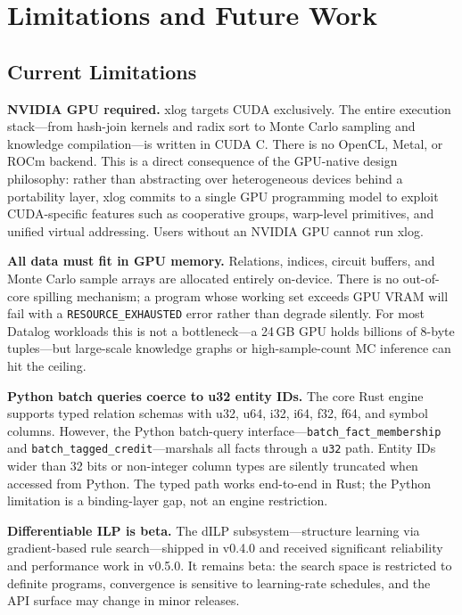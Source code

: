 \section{Limitations and Future Work}\label{sec:limits}

\subsection{Current Limitations}

\textbf{NVIDIA GPU required.} xlog targets CUDA exclusively. The entire execution stack---from hash-join kernels and radix sort to Monte Carlo sampling and knowledge compilation---is written in CUDA C. There is no OpenCL, Metal, or ROCm backend. This is a direct consequence of the GPU-native design philosophy: rather than abstracting over heterogeneous devices behind a portability layer, xlog commits to a single GPU programming model to exploit CUDA-specific features such as cooperative groups, warp-level primitives, and unified virtual addressing. Users without an NVIDIA GPU cannot run xlog.

\textbf{All data must fit in GPU memory.} Relations, indices, circuit buffers, and Monte Carlo sample arrays are allocated entirely on-device. There is no out-of-core spilling mechanism; a program whose working set exceeds GPU VRAM will fail with a \texttt{RESOURCE\_EXHAUSTED} error rather than degrade silently. For most Datalog workloads this is not a bottleneck---a 24\,GB GPU holds billions of 8-byte tuples---but large-scale knowledge graphs or high-sample-count MC inference can hit the ceiling.

\textbf{Python batch queries coerce to u32 entity IDs.} The core Rust engine supports typed relation schemas with u32, u64, i32, i64, f32, f64, and symbol columns. However, the Python batch-query interface---\texttt{batch\_fact\_membership} and \texttt{batch\_tagged\_credit}---marshals all facts through a \texttt{u32} path. Entity IDs wider than 32 bits or non-integer column types are silently truncated when accessed from Python. The typed path works end-to-end in Rust; the Python limitation is a binding-layer gap, not an engine restriction.

\textbf{Differentiable ILP is beta.} The dILP subsystem---structure learning via gradient-based rule search---shipped in v0.4.0 and received significant reliability and performance work in v0.5.0. It remains beta: the search space is restricted to definite programs, convergence is sensitive to learning-rate schedules, and the API surface may change in minor releases.

